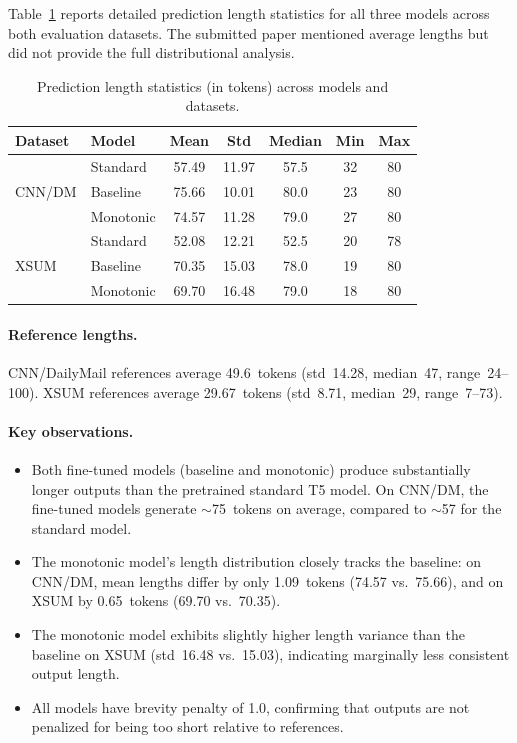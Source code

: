 \documentclass{article}
\begin{document}
Table~\ref{tab:pred-lengths} reports detailed prediction length statistics for all three models across both evaluation datasets. The submitted paper mentioned average lengths but did not provide the full distributional analysis.

\begin{table}[h]
\caption{Prediction length statistics (in tokens) across models and datasets.}
\label{tab:pred-lengths}
\centering
\begin{tabular}{llccccc}
\toprule
Dataset & Model & Mean & Std & Median & Min & Max \\
\midrule
\multirow{3}{*}{CNN/DM}
  & Standard  & 57.49 & 11.97 & 57.5 & 32 & 80 \\
  & Baseline  & 75.66 & 10.01 & 80.0 & 23 & 80 \\
  & Monotonic & 74.57 & 11.28 & 79.0 & 27 & 80 \\
\midrule
\multirow{3}{*}{XSUM}
  & Standard  & 52.08 & 12.21 & 52.5 & 20 & 78 \\
  & Baseline  & 70.35 & 15.03 & 78.0 & 19 & 80 \\
  & Monotonic & 69.70 & 16.48 & 79.0 & 18 & 80 \\
\bottomrule
\end{tabular}
\end{table}

\paragraph{Reference lengths.} CNN/DailyMail references average 49.6~tokens (std~14.28, median~47, range~24--100). XSUM references average 29.67~tokens (std~8.71, median~29, range~7--73).

\paragraph{Key observations.}
\begin{itemize}
    \item Both fine-tuned models (baseline and monotonic) produce substantially longer outputs than the pretrained standard T5 model. On CNN/DM, the fine-tuned models generate $\sim$75~tokens on average, compared to $\sim$57 for the standard model.
    \item The monotonic model's length distribution closely tracks the baseline: on CNN/DM, mean lengths differ by only 1.09~tokens (74.57 vs.\ 75.66), and on XSUM by 0.65~tokens (69.70 vs.\ 70.35).
    \item The monotonic model exhibits slightly higher length variance than the baseline on XSUM (std~16.48 vs.\ 15.03), indicating marginally less consistent output length.
    \item All models have brevity penalty of 1.0, confirming that outputs are not penalized for being too short relative to references.
\end{itemize}
\end{document}
